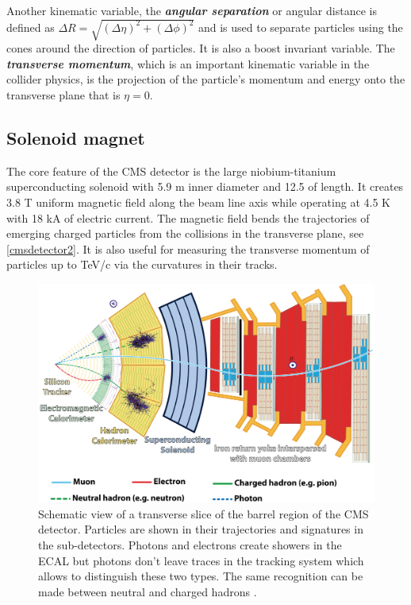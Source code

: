 Another kinematic variable, the \textbf{\emph{angular separation}} or angular distance is defined as $\Delta R = \sqrt{\left(\Delta\eta\right)^2 + \left(\Delta\phi\right)^2}$ and is used to separate particles using the cones around the direction of particles. It is also a boost invariant variable. The \textbf{\emph{transverse momentum}}, which is an important kinematic variable in the collider physics, is the projection of the particle's momentum and energy onto the transverse plane that is $\eta = 0$.

\subsection{Solenoid magnet}

The core feature of the CMS detector is the large niobium-titanium superconducting solenoid with 5.9 m inner diameter and 12.5 of length. It creates 3.8 T uniform magnetic field along the beam line axis while operating at 4.5 K with 18 kA of electric current. The magnetic field bends the trajectories of emerging charged particles from the collisions in the transverse plane, see \autoref{cmsdetector2}. It is also useful for measuring the transverse momentum of particles up to TeV/c via the curvatures in their tracks.

\begin{figure}[ht]
	\centering
	\includegraphics[width=\textwidth]{MSc_Thesis/fig/cmsdetector2.png}
	\vspace{2mm}
	\caption[Schematic view of a transverse slice of the barrel region of the CMS detector. Particles are shown in their trajectories and signatures in the sub-detectors. Photons and electrons create showers in the ECAL but photons don't leave traces in the tracking system which allows to distinguish these two types. The same recognition can be made between neutral and charged hadrons.]{Schematic view of a transverse slice of the barrel region of the CMS detector. Particles are shown in their trajectories and signatures in the sub-detectors. Photons and electrons create showers in the ECAL but photons don't leave traces in the tracking system which allows to distinguish these two types. The same recognition can be made between neutral and charged hadrons \cite{Barney:2120661}.}
	\label{cmsdetector2}
\end{figure}

